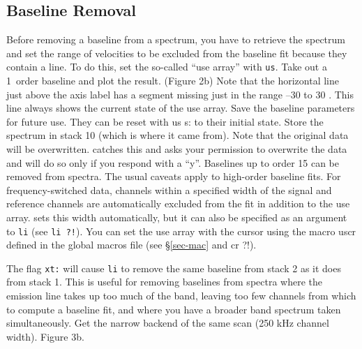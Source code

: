 \subsection{Baseline Removal}
Before removing a baseline from a spectrum, you have to retrieve
the spectrum and set the range of velocities to be excluded from the
baseline fit because they contain a line.  To do this, set the so-called
``use array'' with {\tt us}.
\smallskip
{}
  {Take out a 1\ust\ order baseline and plot the result. 
                   (Figure 2b) Note that the horizontal line just above the axis
		  label has a segment missing just in the range
		  --30 to 30 \kms. This line always shows the current state of 
                  the use array.}
   {Save the baseline parameters for future use.  They can
		  be reset with {\us us s:} to their initial state.}
	 {Store the spectrum in stack 10 (which is where it
		  came from).  Note that the original data will be 
		  overwritten. \COMB catches this and asks your permission
		  to overwrite the data and will do so only if you respond
		  with a ``y''.}  
\smallskip\noindent Baselines up to order 15 can be removed from spectra.
The usual caveats apply to high-order baseline fits.
For frequency-switched data, channels within a specified width of the signal
and reference channels are automatically excluded from the fit in addition
to the use array. \COMB sets this width automatically, but it can also be 
specified as an argument to {\tt li} (see {\tt li ?!}).
You can set the use array with the cursor using the macro {\us uscr} defined
in the global macros file (see \S \ref{sec-mac} and {\us cr ?!}).

The flag {\tt xt:} will cause {\tt li} to remove the same baseline from
stack 2 as it does from stack 1. This is useful for removing baselines
from spectra where the emission line takes up too much of the band, leaving
too few channels from which to compute a baseline fit, and where you have
a broader band spectrum taken simultaneously.
\smallskip
{}
             {Get the narrow backend of the same scan (250 kHz 
                              channel width). Figure 3b.}

